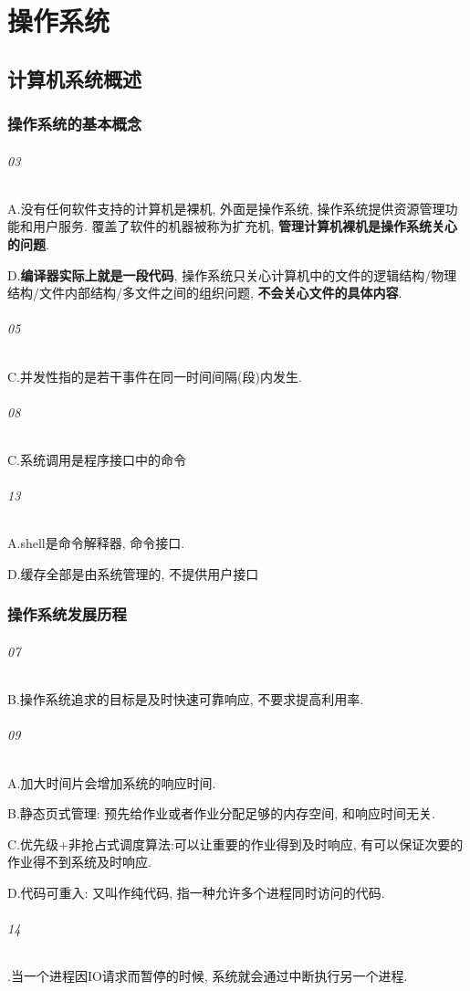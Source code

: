 \part{操作系统}
\chapter{计算机系统概述}
\section{操作系统的基本概念}
\paragraph{03} A.没有任何软件支持的计算机是裸机, 外面是操作系统, 操作系统提供资源管理功能和用户服务. 覆盖了软件的机器被称为扩充机, \textbf{管理计算机裸机是操作系统关心的问题}.\par D.\textbf{编译器实际上就是一段代码}, 操作系统只关心计算机中的文件的逻辑结构/物理结构/文件内部结构/多文件之间的组织问题, \textbf{不会关心文件的具体内容}.
\paragraph{05} C.并发性指的是若干事件在同一时间间隔(段)内发生.
\paragraph{08} C.系统调用是程序接口中的命令
\paragraph{13} A.shell是命令解释器, 命令接口.\par D.缓存全部是由系统管理的, 不提供用户接口
\section{操作系统发展历程}
\paragraph{07} B.操作系统追求的目标是及时快速可靠响应, 不要求提高利用率.
\paragraph{09} A.加大时间片会增加系统的响应时间.\par B.静态页式管理: 预先给作业或者作业分配足够的内存空间, 和响应时间无关.\par C.优先级+非抢占式调度算法:可以让重要的作业得到及时响应, 有可以保证次要的作业得不到系统及时响应. \par D.代码可重入: 又叫作纯代码, 指一种允许多个进程同时访问的代码.
\paragraph{14} \uppercase\expandafter{}.当一个进程因IO请求而暂停的时候, 系统就会通过中断执行另一个进程.
